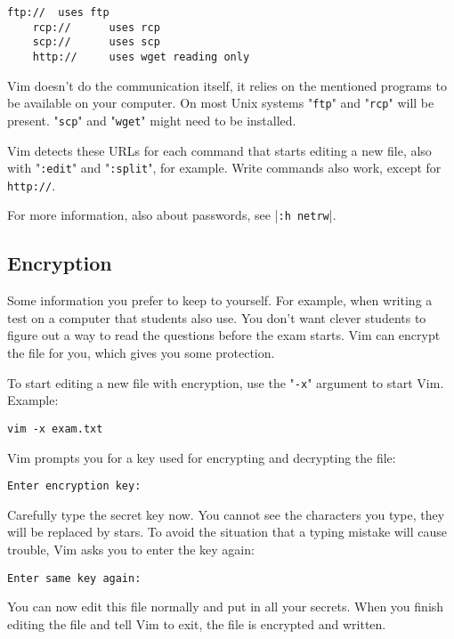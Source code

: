 \begin{Verbatim}[samepage=true]
    ftp:// 	uses ftp
    rcp://      uses rcp
    scp://      uses scp
    http:// 	uses wget reading only
\end{Verbatim}

Vim doesn't do the communication itself, it relies on the mentioned programs to be available on your computer.
On most Unix systems "\texttt{ftp}" and "\texttt{rcp}" will be present.
"\texttt{scp}" and "\texttt{wget}" might need to be installed.

Vim detects these URLs for each command that starts editing a new file, also with "\texttt{:edit}" and "\texttt{:split}", for example.
Write commands also work, except for \texttt{http://}.

For more information, also about passwords, see |\texttt{:h netrw}|.
\subsection{Encryption}
Some information you prefer to keep to yourself.
For example, when writing a test on a computer that students also use.
You don't want clever students to figure out a way to read the questions before the exam starts.
Vim can encrypt the file for you, which gives you some protection.

To start editing a new file with encryption, use the "\texttt{-x}" argument to start Vim.
Example:

\begin{Verbatim}[samepage=true]
 vim -x exam.txt
\end{Verbatim}

Vim prompts you for a key used for encrypting and decrypting the file:

\begin{Verbatim}[samepage=true]
    Enter encryption key: 
\end{Verbatim}

Carefully type the secret key now.
You cannot see the characters you type, they will be replaced by stars.
To avoid the situation that a typing mistake will cause trouble, Vim asks you to enter the key again:

\begin{Verbatim}[samepage=true]
    Enter same key again: 
\end{Verbatim}

You can now edit this file normally and put in all your secrets.
When you finish editing the file and tell Vim to exit, the file is encrypted and written.

